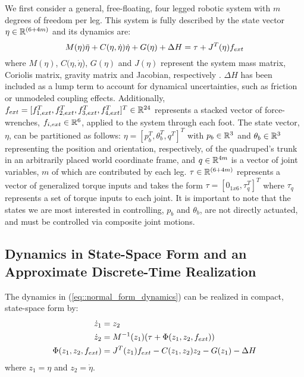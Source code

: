 
We first consider a general, free-floating, four legged robotic system with $m$ degrees of freedom per leg. This system is fully described by the state vector $\eta \in \mathbb{R}^{(6+4m)}$ and its dynamics are:
	\begin{equation}
		\vspace{-1.0mm}
		M(\eta)\ddot{\eta} + C(\eta,\dot{\eta})\dot{\eta} + G(\eta) + \Delta{H} = \tau + J^T(\eta) f_{ext} %
		\label{eq::normal_form_dynamics}
	\end{equation}
where $M(\eta)$, $C(\eta,\dot{\eta}$), $G(\eta)$ and $J(\eta)$ represent the system mass matrix, Coriolis matrix, gravity matrix and Jacobian, respectively \cite{Wieber2006}. $\Delta{H}$ has been included as a lump term to account for dynamical uncertainties, such as friction or unmodeled coupling effects. Additionally, $f_{ext} = [ f_{1,ext}^{T},f_{2,ext}^{T},f_{3,ext}^{T},f_{4,ext}^{T}]^{T} \in \mathbb{R}^{24}$ represents a stacked vector of force-wrenches, $f_{i,ext} \in \mathbb{R}^{6}$, applied to the system through each \Ith foot. The state vector, $\eta$, can be partitioned as follows: $\eta = [ p_{b}^{T}, \theta_{b}^{T}, q^{T} ]^{T}$ with $p_{b} \in \mathbb{R}^{3}$ and $\theta_{b} \in \mathbb{R}^{3}$ representing the position and orientation, respectively, of the quadruped's trunk in an arbitrarily placed world coordinate frame, and $q \in \mathbb{R}^{4 m}$ is a vector of joint variables, $m$ of which are contributed by each leg. $\tau \in \mathbb{R}^{(6+4m)}$ represents a vector of generalized torque inputs and takes the form $\tau = [ 0_{1x6}, \tau_{q}^{T} ]^{T}$ where $\tau_{q}$ represents a set of torque inputs to each joint. It is important to note that the states we are most interested in controlling, $p_{b}$ and $\theta_{b}$, are not directly actuated, and must be controlled via composite joint motions.


\subsection{Dynamics in State-Space Form and an Approximate Discrete-Time Realization}
%
%
The dynamics in (\ref{eq::normal_form_dynamics}) can be realized in compact, state-space form by:
	\begin{equation}
		\vspace{-1.0mm}
		\begin{split}
		\dot{z}_{1} 				&= z_{2} \\
		\dot{z}_{2} 				&= M^{-1}(z_{1})(\tau + \Phi(z_{1},z_{2},f_{ext})) \\
		\Phi(z_{1},z_{2},f_{ext}) 	&= J^T(z_{1}) f_{ext} - C(z_{1},z_{2})z_{2} - G(z_{1}) - \Delta{H}
		\end{split}
		\label{eq::state_space_dynamics}
	\end{equation}
where $z_{1}=\eta$ and $z_{2}=\dot{\eta}$. 

